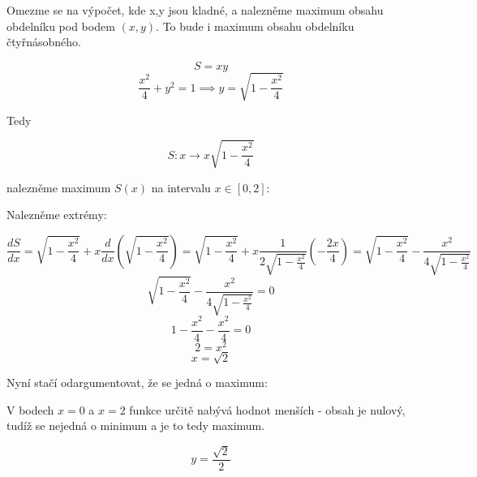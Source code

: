 \documentclass[10pt,a4paper]{article}
\theoremstyle{plain}
\theoremstyle{definition}
\begin{document}
\newpage

\section{}

Omezme se na výpočet, kde x,y jsou kladné, a nalezněme maximum obsahu obdelníku pod bodem $(x,y)$. To bude i maximum obsahu obdelníku čtyřnásobného.

\[ S = xy \]
\[ \frac{x^2}{4} + y^2 = 1 \implies y = \sqrt{1-\frac{x^2}{4}} \]

Tedy 

\[ S : x \to x \sqrt{1-\frac{x^2}{4}}  \]

nalezněme maximum $S(x)$ na intervalu $x \in [0,2]$:

Nalezněme extrémy:

\[ \frac{dS}{dx} = \sqrt{1-\frac{x^2}{4}} + x \frac{d}{dx} \left( \sqrt{1-\frac{x^2}{4}}\right) = \sqrt{1-\frac{x^2}{4}} + x \frac{1}{2\sqrt{1-\frac{x^2}{4}}} \left( - \frac{2x}{4} \right) 
= \sqrt{1-\frac{x^2}{4}} -  \frac{x^2}{4\sqrt{1-\frac{x^2}{4}}}  \]
\[ \sqrt{1-\frac{x^2}{4}} -  \frac{x^2}{4\sqrt{1-\frac{x^2}{4}}}   = 0 \]
\[ 1-\frac{x^2}{4} -  \frac{x^2}{4}   = 0 \]
\[ 2   = x^2 \]
\[ x = \sqrt{2} \]

Nyní stačí odargumentovat, že se jedná o maximum:

V bodech $x = 0$ a $x = 2$ funkce určitě nabývá hodnot menších - obsah je nulový, tudíž se nejedná o minimum a je to tedy maximum.

\[y= \frac{\sqrt{2}}{2}\]
\end{document}
